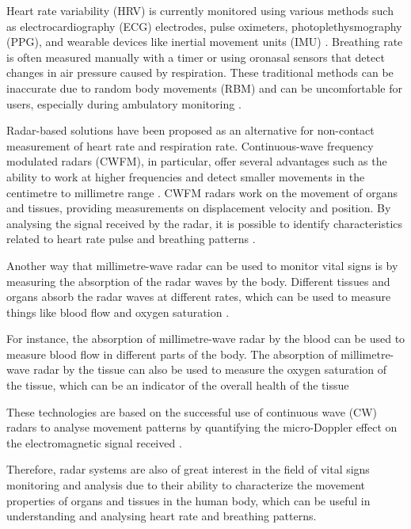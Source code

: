 	Heart rate variability (HRV) is currently monitored using various methods such as electrocardiography (ECG) electrodes, pulse oximeters, photoplethysmography (PPG), and wearable devices like inertial movement units (IMU) \cite{Antolinos2020, Lv2018}. Breathing rate is often measured manually with a timer or using oronasal sensors that detect changes in air pressure caused by respiration. These traditional methods can be inaccurate due to random body movements (RBM) and can be uncomfortable for users, especially during ambulatory monitoring \cite{Antolinos2020}.
	
	Radar-based solutions have been proposed as an alternative for non-contact measurement of heart rate and respiration rate. Continuous-wave frequency modulated radars (CWFM), in particular, offer several advantages such as the ability to work at higher frequencies and detect smaller movements in the centimetre to millimetre range \cite{Lv2018}. CWFM radars work on the movement of organs and tissues, providing measurements on displacement velocity and position. By analysing the signal received by the radar, it is possible to identify characteristics related to heart rate pulse and breathing patterns \cite{Antolinos2020}.
	
	Another way that millimetre-wave radar can be used to monitor vital signs is by measuring the absorption of the radar waves by the body. Different tissues and organs absorb the radar waves at different rates, which can be used to measure things like blood flow and oxygen saturation \cite{Weenk2017}.
	
	For instance, the absorption of millimetre-wave radar by the blood can be used to measure blood flow in different parts of the body. The absorption of millimetre-wave radar by the tissue can also be used to measure the oxygen saturation of the tissue, which can be an indicator of the overall health of the tissue \cite{Amin2017, Antolinos2020}
	
	These technologies are based on the successful use of continuous wave (CW) radars to analyse movement patterns by quantifying the micro-Doppler effect on the electromagnetic signal received \cite{Antolinos2020, Seifert2019}. 
	
	Therefore, radar systems are also of great interest in the field of vital signs monitoring and analysis due to their ability to characterize the movement properties of organs and tissues in the human body, which can be useful in understanding and analysing heart rate and breathing patterns.

